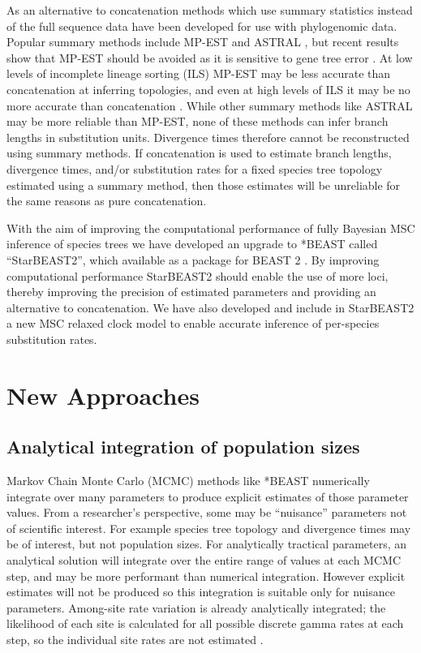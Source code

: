 \documentclass[12pt]{article}
\begin{document}
As an alternative to concatenation methods which use summary statistics instead
of the full sequence data have been developed for use with phylogenomic data.
Popular summary methods include MP-EST and ASTRAL \citep{Liu2010,
Mirarab01092014}, but recent results show that MP-EST should be avoided as it is
sensitive to gene tree error \citep{Mirarab15062015, Xi201563}. At low levels of
incomplete lineage sorting (ILS) MP-EST may be less accurate than concatenation at
inferring topologies, and even at high levels of ILS it may be no more accurate
than concatenation \citep{Ogilvie01052016}. While other summary methods like
ASTRAL may be more reliable than MP-EST, none of these methods can infer branch
lengths in substitution units. Divergence times therefore cannot be
reconstructed using summary methods. If concatenation is used to estimate branch
lengths, divergence times, and/or substitution rates for a fixed species tree
topology estimated using a summary method, then those estimates will be
unreliable for the same reasons as pure concatenation.

With the aim of improving the computational performance of fully Bayesian
MSC inference of species trees we have developed an upgrade
to *BEAST called ``StarBEAST2'', which available as a package for BEAST 2
\citep{10.1371/journal.pcbi.1003537}. By improving computational performance
StarBEAST2 should enable the use of more loci, thereby improving the precision
of estimated parameters and providing an alternative to concatenation. We have
also developed and include in StarBEAST2 a new MSC relaxed
clock model to enable accurate inference of per-species substitution rates.

\section*{New Approaches}

\subsection*{Analytical integration of population sizes}

Markov Chain Monte Carlo (MCMC) methods like *BEAST numerically integrate over
many parameters to produce explicit estimates of those parameter values. From a
researcher's perspective, some may be ``nuisance'' parameters not of scientific
interest. For example species tree topology and divergence times may be of
interest, but not population sizes. For analytically tractical parameters, an
analytical solution will integrate over the entire range of values at each MCMC
step, and may be more performant than numerical integration. However explicit
estimates will not be produced so this integration is suitable only for nuisance
parameters. Among-site rate variation is already analytically integrated; the
likelihood of each site is calculated for all possible discrete gamma rates at
each step, so the individual site rates are not estimated \citep{Yang1994}.
\end{document}
